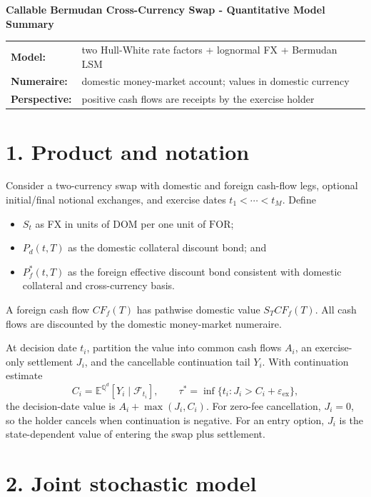 \documentclass[9pt,letterpaper]{extarticle}
\newcommand{\Qd}{\mathbb{Q}^{d}}
\newcommand{\E}{\mathbb{E}}
\newcommand{\F}{\mathcal{F}}
\newcommand{\DOM}{\ensuremath{\mathrm{DOM}}}
\newcommand{\FOR}{\ensuremath{\mathrm{FOR}}}
\begin{document}
{\Large\bfseries\color{QuantNavy} Callable Bermudan Cross-Currency Swap - Quantitative Model Summary}\par
\vspace{2pt}
\begin{tabular}{@{}>{\bfseries}l l@{}}
Model: & two Hull-White rate factors + lognormal FX + Bermudan LSM \\
Numeraire: & domestic money-market account; values in domestic currency \\
Perspective: & positive cash flows are receipts by the exercise holder
\end{tabular}

\section{1. Product and notation}

Consider a two-currency swap with domestic and foreign cash-flow legs, optional initial/final notional exchanges, and exercise dates $t_1<\cdots<t_M$. Define
\begin{itemize}
  \item $S_t$ as FX in units of \DOM{} per one unit of \FOR{};
  \item $P_d(t,T)$ as the domestic collateral discount bond; and
  \item $P_f^{*}(t,T)$ as the foreign effective discount bond consistent with domestic collateral and cross-currency basis.
\end{itemize}
A foreign cash flow $CF_f(T)$ has pathwise domestic value $S_TCF_f(T)$. All cash flows are discounted by the domestic money-market numeraire.

At decision date $t_i$, partition the value into common cash flows $A_i$, an exercise-only settlement $J_i$, and the cancellable continuation tail $Y_i$. With continuation estimate
\[
  C_i=\E^{\Qd}\!\left[Y_i\mid\F_{t_i}\right],
  \qquad
  \tau^*=\inf\{t_i:J_i>C_i+\varepsilon_{\mathrm{ex}}\},
\]
the decision-date value is $A_i+\max(J_i,C_i)$. For zero-fee cancellation, $J_i=0$, so the holder cancels when continuation is negative. For an entry option, $J_i$ is the state-dependent value of entering the swap plus settlement.

\section{2. Joint stochastic model}
\end{document}
